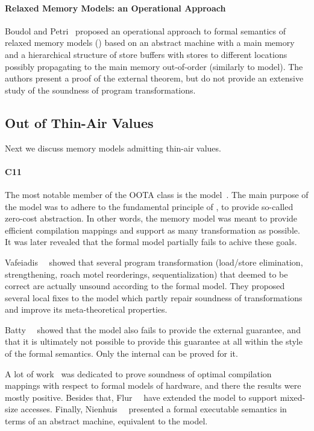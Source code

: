 \paragraph{Relaxed Memory Models: an Operational Approach}

Boudol and Petri~\cite{Boudol-Petri:POPL09} proposed 
an operational approach to 
formal semantics of relaxed memory models (\RMMOA)
based on an abstract machine with a main memory 
and a hierarchical structure of store buffers 
with stores to different locations possibly 
propagating to the main memory out-of-order
(similarly to \PSO model).
The authors present a proof of the external \DRF theorem,
but do not provide an extensive study 
of the soundness of program transformations.

\subsection{Out of Thin-Air Values}

Next we discuss memory models admitting thin-air values. 

\paragraph{C11}

The most notable member of the OOTA class is the \CMM model~\cite{Batty-al:POPL11}.
The main purpose of the \CMM model was to adhere to the fundamental principle of \CPP, 
\ie to provide so-called zero-cost abstraction. 
In other words, the memory model was meant to provide 
efficient compilation mappings and support as many transformation as possible.
It was later revealed that the formal model partially fails to achive these goals.

Vafeiadis~\etal~\cite{Vafeiadis-al:POPL15} showed that several program transformation 
(load/store elimination, strengthening, roach motel reorderings, sequentialization) 
that deemed to be correct are actually unsound according to the formal model.
They proposed several local fixes to the model which 
partly repair soundness of transformations and improve 
its meta-theoretical properties. 

Batty~\etal~\cite{Batty-al:ESOP15} showed that 
the model also fails to provide the external \DRF guarantee, 
and that it is ultimately not possible to provide this guarantee
at all within the style of the \CMM formal semantics.
Only the internal \DRF can be proved for it. 

A lot of work~\cite{Batty-al:POPL11, Sarkar-al:PLDI12, Batty-al:POPL12, Batty-al:POPL16} 
was dedicated to prove soundness of optimal compilation mappings 
with respect to formal models of hardware, 
and there the results were mostly positive.
Besides that, Flur~\etal~\cite{Flur-al:POPL17} have extended 
the model to support mixed-size accesses.
Finally, Nienhuis~\etal~\cite{Nienhuis-al:OOPSLA16} presented 
a formal executable semantics in terms of an abstract machine, 
equivalent to the \CMM model. 

